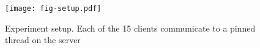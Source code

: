 \begin{figure}[H]
\texttt{[image: fig-setup.pdf]}
\caption{Experiment setup. Each of the 15 clients communicate to a pinned thread on the server}
\label{fig:setup}
\end{figure}
